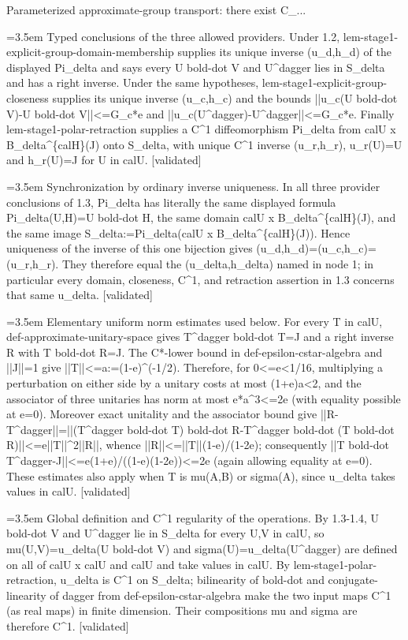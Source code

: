 \documentclass{article}
\newcommand{\step}[1]{\par\noindent\hangindent=3.5em\hangafter=1%
  \makebox[3.5em][l]{\textbf{#1.}}}
\newcommand{\steptag}[1]{\hfill{\small\textsf{[#1]}}}
\begin{document}
\begin{proofbox}{Parameterized approximate-group transport: there exist C\_...}
\step{1.3} Typed conclusions of the three allowed providers. Under 1.2, lem-stage1-explicit-group-domain-membership supplies its unique inverse (u\_d,h\_d) of the displayed Pi\_delta and says every U bold-dot V and U\textasciicircum{}dagger lies in S\_delta and has a right inverse. Under the same hypotheses, lem-stage1-explicit-group-closeness supplies its unique inverse (u\_c,h\_c) and the bounds ||u\_c(U bold-dot V)-U bold-dot V||<=G\_c*e and ||u\_c(U\textasciicircum{}dagger)-U\textasciicircum{}dagger||<=G\_c*e. Finally lem-stage1-polar-retraction supplies a C\textasciicircum{}1 diffeomorphism Pi\_delta from calU x B\_delta\textasciicircum{}\{calH\}(J) onto S\_delta, with unique C\textasciicircum{}1 inverse (u\_r,h\_r), u\_r(U)=U and h\_r(U)=J for U in calU. \steptag{validated} \\[4pt]
\step{1.4} Synchronization by ordinary inverse uniqueness. In all three provider conclusions of 1.3, Pi\_delta has literally the same displayed formula Pi\_delta(U,H)=U bold-dot H, the same domain calU x B\_delta\textasciicircum{}\{calH\}(J), and the same image S\_delta:=Pi\_delta(calU x B\_delta\textasciicircum{}\{calH\}(J)). Hence uniqueness of the inverse of this one bijection gives (u\_d,h\_d)=(u\_c,h\_c)=(u\_r,h\_r). They therefore equal the (u\_delta,h\_delta) named in node 1; in particular every domain, closeness, C\textasciicircum{}1, and retraction assertion in 1.3 concerns that same u\_delta. \steptag{validated} \\[4pt]
\step{1.5} Elementary uniform norm estimates used below. For every T in calU, def-approximate-unitary-space gives T\textasciicircum{}dagger bold-dot T=J and a right inverse R with T bold-dot R=J. The C*-lower bound in def-epsilon-cstar-algebra and ||J||=1 give ||T||<=a:=(1-e)\textasciicircum{}(-1/2). Therefore, for 0<=e<1/16, multiplying a perturbation on either side by a unitary costs at most (1+e)a<2, and the associator of three unitaries has norm at most e*a\textasciicircum{}3<=2e (with equality possible at e=0). Moreover exact unitality and the associator bound give ||R-T\textasciicircum{}dagger||=||(T\textasciicircum{}dagger bold-dot T) bold-dot R-T\textasciicircum{}dagger bold-dot (T bold-dot R)||<=e||T||\textasciicircum{}2||R||, whence ||R||<=||T||(1-e)/(1-2e); consequently ||T bold-dot T\textasciicircum{}dagger-J||<=e(1+e)/((1-e)(1-2e))<=2e (again allowing equality at e=0). These estimates also apply when T is mu(A,B) or sigma(A), since u\_delta takes values in calU. \steptag{validated} \\[4pt]
\step{1.6} Global definition and C\textasciicircum{}1 regularity of the operations. By 1.3-1.4, U bold-dot V and U\textasciicircum{}dagger lie in S\_delta for every U,V in calU, so mu(U,V)=u\_delta(U bold-dot V) and sigma(U)=u\_delta(U\textasciicircum{}dagger) are defined on all of calU x calU and calU and take values in calU. By lem-stage1-polar-retraction, u\_delta is C\textasciicircum{}1 on S\_delta; bilinearity of bold-dot and conjugate-linearity of dagger from def-epsilon-cstar-algebra make the two input maps C\textasciicircum{}1 (as real maps) in finite dimension. Their compositions mu and sigma are therefore C\textasciicircum{}1. \steptag{validated} \\[4pt]

\end{proofbox}
\end{document}

